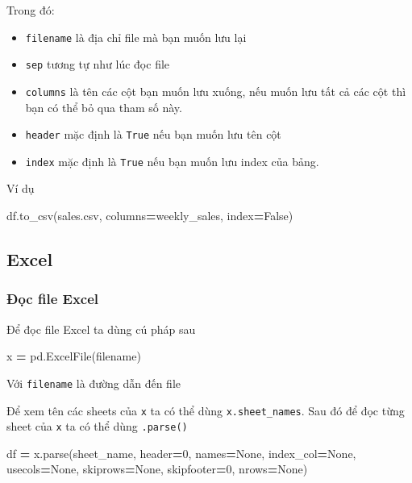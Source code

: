 \documentclass[
]{book}
\newenvironment{Shaded}{\begin{snugshade}}{\end{snugshade}}
\newcommand{\DecValTok}[1]{\textcolor[rgb]{0.00,0.00,0.81}{#1}}
\newcommand{\NormalTok}[1]{#1}
\newcommand{\OperatorTok}[1]{\textcolor[rgb]{0.81,0.36,0.00}{\textbf{#1}}}
\newcommand{\StringTok}[1]{\textcolor[rgb]{0.31,0.60,0.02}{#1}}
\newcommand{\VariableTok}[1]{\textcolor[rgb]{0.00,0.00,0.00}{#1}}
\begin{document}
Trong đó:

\begin{itemize}
\item
  \texttt{filename} là địa chỉ file mà bạn muốn lưu lại
\item
  \texttt{sep} tương tự như lúc đọc file
\item
  \texttt{columns} là tên các cột bạn muốn lưu xuống, nếu muốn lưu tất cả các cột thì
  bạn có thể bỏ qua tham số này.
\item
  \texttt{header} mặc định là \texttt{True} nếu bạn muốn lưu tên cột
\item
  \texttt{index} mặc định là \texttt{True} nếu bạn muốn lưu index của bảng.
\end{itemize}

Ví dụ

\begin{Shaded}
\begin{Highlighting}[]
\NormalTok{df.to\_csv(}\StringTok{\textquotesingle{}sales.csv\textquotesingle{}}\NormalTok{, columns}\OperatorTok{=}\StringTok{\textquotesingle{}weekly\_sales\textquotesingle{}}\NormalTok{, index}\OperatorTok{=}\VariableTok{False}\NormalTok{)}
\end{Highlighting}
\end{Shaded}

\subsection{Excel}\label{excel}

\subsubsection{Đọc file Excel}\label{ux111ux1ecdc-file-excel}

Để đọc file Excel ta dùng cú pháp sau

\begin{Shaded}
\begin{Highlighting}[]
\NormalTok{x }\OperatorTok{=}\NormalTok{ pd.ExcelFile(filename)}
\end{Highlighting}
\end{Shaded}

Với \texttt{filename} là đường dẫn đến file

Để xem tên các sheets của \texttt{x} ta có thể dùng \texttt{x.sheet\_names}. Sau đó để đọc từng sheet của \texttt{x} ta có thể dùng \texttt{.parse()}

\begin{Shaded}
\begin{Highlighting}[]
\NormalTok{df }\OperatorTok{=}\NormalTok{ x.parse(sheet\_name, header}\OperatorTok{=}\DecValTok{0}\NormalTok{, names}\OperatorTok{=}\VariableTok{None}\NormalTok{, index\_col}\OperatorTok{=}\VariableTok{None}\NormalTok{, usecols}\OperatorTok{=}\VariableTok{None}\NormalTok{, skiprows}\OperatorTok{=}\VariableTok{None}\NormalTok{, skipfooter}\OperatorTok{=}\DecValTok{0}\NormalTok{, nrows}\OperatorTok{=}\VariableTok{None}\NormalTok{)}
\end{Highlighting}
\end{Shaded}
\end{document}
